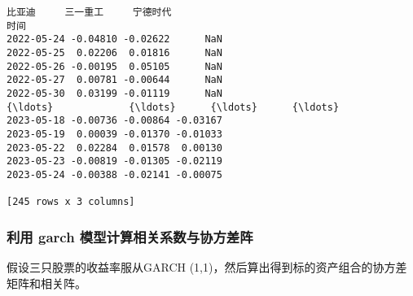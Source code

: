 \documentclass[11pt]{article}
\makeatletter
\newcommand{\boxspacing}{\kern\kvtcb@left@rule\kern\kvtcb@boxsep}
\newcommand{\prompt}[4]{
        {\ttfamily\llap{{\color{#2}[#3]:\hspace{3pt}#4}}\vspace{-\baselineskip}}
    }
\makeatother
\begin{document}
            \begin{tcolorbox}[breakable, size=fbox, boxrule=.5pt, pad at break*=1mm, opacityfill=0]
\prompt{Out}{outcolor}{4}{\boxspacing}
\begin{Verbatim}[commandchars=\\\{\}]
                比亚迪     三一重工     宁德时代
时间
2022-05-24 -0.04810 -0.02622      NaN
2022-05-25  0.02206  0.01816      NaN
2022-05-26 -0.00195  0.05105      NaN
2022-05-27  0.00781 -0.00644      NaN
2022-05-30  0.03199 -0.01119      NaN
{\ldots}             {\ldots}      {\ldots}      {\ldots}
2023-05-18 -0.00736 -0.00864 -0.03167
2023-05-19  0.00039 -0.01370 -0.01033
2023-05-22  0.02284  0.01578  0.00130
2023-05-23 -0.00819 -0.01305 -0.02119
2023-05-24 -0.00388 -0.02141 -0.00075

[245 rows x 3 columns]
\end{Verbatim}
\end{tcolorbox}

    \hypertarget{ux5229ux7528-garch-ux6a21ux578bux8ba1ux7b97ux76f8ux5173ux7cfbux6570ux4e0eux534fux65b9ux5deeux9635}{%
\subsubsection{利用 garch
模型计算相关系数与协方差阵}\label{ux5229ux7528-garch-ux6a21ux578bux8ba1ux7b97ux76f8ux5173ux7cfbux6570ux4e0eux534fux65b9ux5deeux9635}}

假设三只股票的收益率服从GARCH
(1,1)，然后算出得到标的资产组合的协方差矩阵和相关阵。
\end{document}

